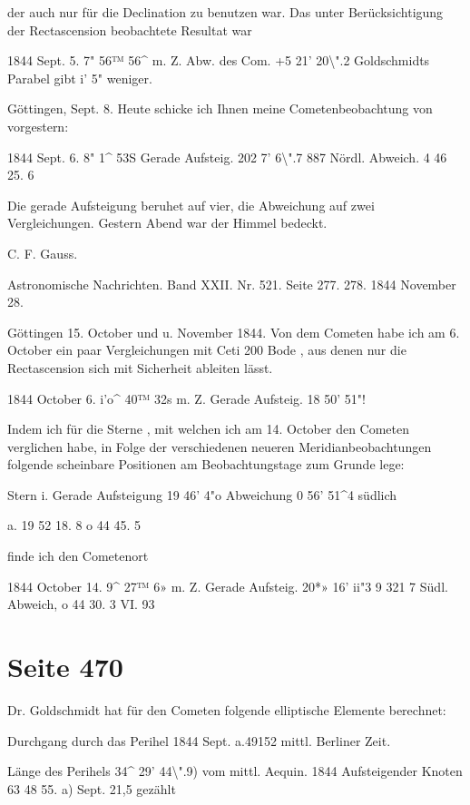 \documentclass[10pt,a4paper]{article}
\begin{document}
der auch nur für die Declination zu benutzen war. Das unter Berücksichtigung der Rectascension beobachtete Resultat war

1844 Sept. 5. 7" 56™ 56\textasciicircum{} m. Z. Abw. des Com. +5\textdegree{} 21' 20\textbackslash{}".2 Goldschmidts Parabel gibt i' 5" weniger.

Göttingen, Sept. 8. Heute schicke ich Ihnen meine Cometenbeobachtung von vorgestern:

1844 Sept. 6. 8" 1\textasciicircum{} 53S Gerade Aufsteig. 202\textdegree{} 7' 6\textbackslash{}".7 887 Nördl. Abweich. 4 46 25. 6

Die gerade Aufsteigung beruhet auf vier, die Abweichung auf zwei Vergleichungen. Gestern Abend war der Himmel bedeckt.

C. F. Gauss.

Astronomische Nachrichten. Band XXII. Nr. 521. Seite 277. 278. 1844 November 28.

Göttingen 15. October und u. November 1844. Von dem Cometen habe ich am 6. October ein paar Vergleichungen mit Ceti 200 Bode , aus denen nur die Rectascension sich mit Sicherheit ableiten lässt.

1844 October 6. i'o\textasciicircum{} 40™ 32s m. Z. Gerade Aufsteig. 18\textdegree{} 50' 51"!

Indem ich für die Sterne , mit welchen ich am 14. October den Cometen verglichen habe, in Folge der verschiedenen neueren Meridianbeobachtungen folgende scheinbare Positionen am Beobachtungstage zum Grunde lege:

Stern i. Gerade Aufsteigung 19\textdegree{} 46' 4"o Abweichung 0\textdegree{} 56' 51\textasciicircum{}4 südlich

a. 19 52 18. 8 o 44 45. 5

finde ich den Cometenort

1844 October 14. 9\textasciicircum{} 27™ 6» m. Z. Gerade Aufsteig. 20*» 16' ii"3 9 321 7 Südl. Abweich, o 44 30. 3 VI. 93


\newpage
\section*{Seite 470}
Dr. Goldschmidt hat für den Cometen folgende elliptische Elemente berechnet:

Durchgang durch das Perihel 1844 Sept. a.49152 mittl. Berliner Zeit.

Länge des Perihels 34\textasciicircum{}\textdegree{} 29' 44\textbackslash{}".9) vom mittl. Aequin. 1844 Aufsteigender Knoten 63 48 55. a) Sept. 21,5 gezählt
\end{document}
